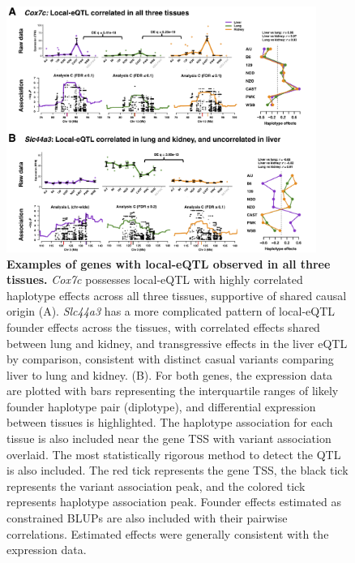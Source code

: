 \documentclass[9pt,twocolumn,twoside]{gsajnl}
\begin{document}
\begin{figure}[h!]
\renewcommand{\familydefault}{\sfdefault}\normalfont
\centering
\includegraphics[width=0.9\textwidth, trim={0in 0in 0in 0in}, clip]{figs/correlated_local_eqtl_update.png}
\caption{\textbf{Examples of genes with local-eQTL observed in all three tissues.} \textit{Cox7c} possesses local-eQTL with highly correlated haplotype effects across all three tissues, supportive of shared causal origin (A). \textit{Slc44a3} has a more complicated pattern of local-eQTL founder effects across the tissues, with correlated effects shared between lung and kidney, and transgressive effects in the liver eQTL by comparison, consistent with distinct casual variants comparing liver to lung and kidney. (B). For both genes, the expression data are plotted with bars representing the interquartile ranges of likely founder haplotype pair (diplotype), and differential expression between tissues is highlighted. The haplotype association for each tissue is also included near the gene TSS with variant association overlaid. The most statistically rigorous method to detect the QTL is also included. The red tick represents the gene TSS, the black tick represents the variant association peak, and the colored tick represents haplotype association peak. Founder effects estimated as constrained BLUPs are also included with their pairwise correlations. Estimated effects were generally consistent with the expression data.\label{fig:correlated_local_eqtl}}
\end{figure}
\end{document}
